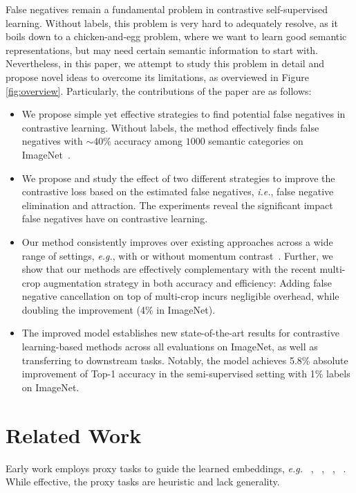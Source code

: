 \documentclass[10pt,twocolumn,letterpaper]{article}
\begin{document}
False negatives remain a fundamental problem in contrastive self-supervised learning. Without labels, this problem is very hard to adequately resolve, as it boils down to a chicken-and-egg problem, where we want to learn good semantic representations, but may need certain semantic information to start with. Nevertheless, in this paper, we attempt to study this problem in detail and propose novel ideas to overcome its limitations, as overviewed in Figure \ref{fig:overview}. Particularly, the contributions of the paper are as follows:
\begin{itemize}
    \item We propose simple yet effective strategies to find potential false negatives in contrastive learning. Without  labels, the method effectively finds false negatives with $\sim$40\% accuracy among $1000$ semantic categories on ImageNet~\cite{imagenet}.
    \item We propose and study the effect of two different strategies to improve the contrastive loss based on the estimated false negatives, \emph{i.e.}, false negative elimination and attraction. The experiments reveal the significant impact false negatives have on contrastive learning.
    \item Our method consistently improves over existing approaches across a wide range of settings, \emph{e.g.}, with or without momentum contrast~\cite{he2019moco}. Further, we show that our methods are effectively complementary with the recent multi-crop augmentation strategy in both accuracy and efficiency: Adding false negative cancellation on top of multi-crop incurs negligible overhead, while doubling the improvement (4\% in ImageNet).
    \item The improved model establishes new state-of-the-art results for contrastive learning-based methods across all evaluations on ImageNet, as well as transferring to downstream tasks. Notably, the model achieves 5.8\% absolute improvement of Top-1 accuracy in the semi-supervised setting with 1\% labels on ImageNet.
\end{itemize}


 \section{Related Work}
\label{sec:related_work}


Early work employs proxy tasks to guide the learned embeddings, \emph{e.g.} ~\cite{gidaris2018unsupervised}, ~\cite{doersch2016unsupervised}, ~\cite{noroozi2017unsupervised}, ~\cite{pascal2018extracting}. While effective, the proxy tasks are heuristic and lack generality.
\end{document}
